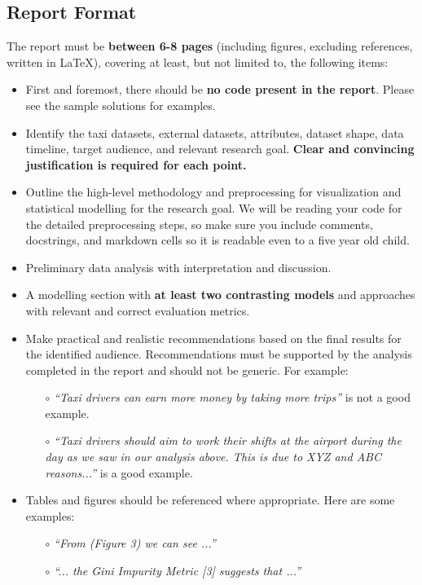 \documentclass[12pt]{article}
\begin{document}
\subsection*{Report Format}
The report must be \textbf{between 6-8 pages} (including figures, excluding references, written in LaTeX), covering at least, but not limited to, the following items:
\begin{itemize}
    \item First and foremost, there should be \textbf{no code present in the report}. Please see the sample solutions for examples.
    \item Identify the taxi datasets, external datasets, attributes, dataset shape, data timeline, target audience, and relevant research goal. \textbf{Clear and convincing justification is required for each point.}
    \item Outline the high-level methodology and preprocessing for visualization and statistical modelling for the research goal. We will be reading your code for the detailed preprocessing steps, so make sure you include comments, docstrings, and markdown cells so it is readable even to a five year old child.
    \item Preliminary data analysis with interpretation and discussion.
    \item A modelling section with \textbf{at least two contrasting models }and approaches with relevant and correct evaluation metrics.
    \item Make practical and realistic recommendations based on the final results for the identified audience. Recommendations must be supported by the analysis completed in the report and should not be generic. For example:
    \begin{itemize}
        \item[$\circ$] \textit{``Taxi drivers can earn more money by taking more trips''} is not a good example.
        \item[$\circ$] \textit{``Taxi drivers should aim to work their shifts at the airport during the day as we saw in our analysis above. This is due to XYZ and ABC reasons...''} is a good example.
    \end{itemize}
    \item Tables and figures should be referenced where appropriate. Here are some examples: 
    \begin{itemize}
        \item[$\circ$] \textit{``From (Figure 3) we can see ...''}
        \item[$\circ$] \textit{``... the Gini Impurity Metric [3] suggests that ...''}

\end{itemize}
\end{itemize}
\end{document}

